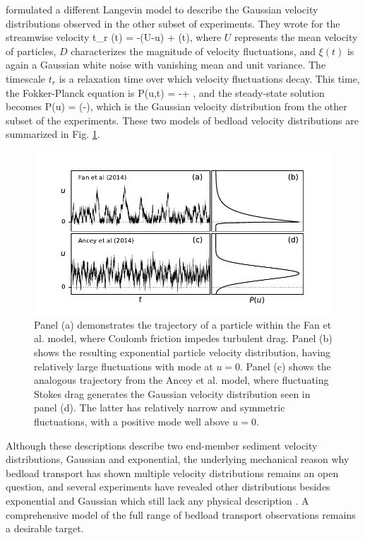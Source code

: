 \citet{Ancey2014} formulated a different Langevin model to describe the Gaussian velocity distributions observed in the other subset of experiments. They wrote for the streamwise velocity 
\be t_r (t) = -(U-u) + \xi(t),\ee
where $U$ represents the mean velocity of particles, $D$ characterizes the magnitude of velocity fluctuations, and $\xi(t)$ is again a Gaussian white noise with vanishing mean and unit variance. The timescale $t_r$ is a relaxation time over which velocity fluctuations decay. This time, the Fokker-Planck equation is
\be {} P(u,t) = - + ,\ee 
and the steady-state solution becomes
\be P(u) =  \exp\Big(-\Big), \ee
which is the Gaussian velocity distribution from the other subset of the experiments.
These two models of bedload velocity distributions are summarized in Fig. \ref{fig:fanAncey}.
\begin{figure}[!htbp]
	\includegraphics[width=\linewidth,keepaspectratio]{./figures/ch1/fanAncey.pdf}
	\caption{Panel (a) demonstrates the trajectory of a particle within the Fan et al. model, where Coulomb friction impedes turbulent drag. Panel (b) shows the resulting exponential particle velocity distribution, having relatively large fluctuations with mode at $u=0$.
	Panel (c) shows the analogous trajectory from the Ancey et al. model, where fluctuating Stokes drag generates the Gaussian velocity distribution seen in panel (d). The latter has relatively narrow and symmetric fluctuations, with a positive mode well above $u=0$.}
	\label{fig:fanAncey}
\end{figure}
Although these descriptions describe two end-member sediment velocity distributions, Gaussian and exponential, the underlying mechanical reason why bedload transport has shown multiple velocity distributions remains an open question, and several experiments have revealed other distributions besides exponential and Gaussian which still lack any physical description \citep[e.g.][]{Houssais2012,Liu2019}.
A comprehensive model of the full range of bedload transport observations remains a desirable target.

